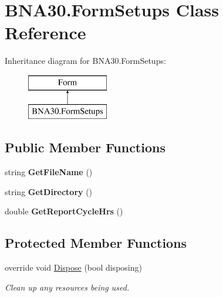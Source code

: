 \hypertarget{class_b_n_a30_1_1_form_setups}{}\section{B\+N\+A30.\+Form\+Setups Class Reference}
\label{class_b_n_a30_1_1_form_setups}
Inheritance diagram for B\+N\+A30.\+Form\+Setups\+:\begin{figure}[H]
\begin{center}
\leavevmode
\includegraphics[height=2.000000cm]{class_b_n_a30_1_1_form_setups}
\end{center}
\end{figure}
\subsection*{Public Member Functions}
\begin{DoxyCompactItemize}
\item 
\mbox{\label{class_b_n_a30_1_1_form_setups_acd3bb18418cab718eb24c3a3b90b55bf}} 
string {\bfseries Get\+File\+Name} ()
\item 
\mbox{\label{class_b_n_a30_1_1_form_setups_a0f73fa53796f3d7720c16fed39d37c90}} 
string {\bfseries Get\+Directory} ()
\item 
\mbox{\label{class_b_n_a30_1_1_form_setups_a5f4320c53be3bf7c1dd3d5067493b942}} 
double {\bfseries Get\+Report\+Cycle\+Hrs} ()
\end{DoxyCompactItemize}
\subsection*{Protected Member Functions}
\begin{DoxyCompactItemize}
\item 
override void \mbox{\hyperlink{class_b_n_a30_1_1_form_setups_ac9d2080c1d93484a1ab0a2cd9224cae2}{Dispose}} (bool disposing)
\begin{DoxyCompactList}\small\item\em Clean up any resources being used. \end{DoxyCompactList}\end{DoxyCompactItemize}
